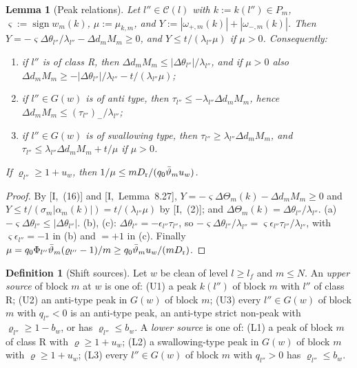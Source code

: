 \documentclass[10pt]{amsart}
\newtheorem{lemma}[theorem]{Lemma}
\theoremstyle{definition}
\newtheorem{definition}[theorem]{Definition}
\theoremstyle{remark}
\newcommand{\sgn}{\operatorname{sign}}
\begin{document}
\begin{lemma}[Peak relations]\label{lem:II-peakrel}
Let $l''\in\mathcal C(l)$ with $k:=k(l'')\in P_m$, $\varsigma:=\sgn w_m(k)$,
$\mu:=\mu_{k,m}$, and $Y:=|\omega_{+,m}(k)|+|\omega_{-,m}(k)|$.  Then
$Y=-\varsigma\Delta\theta_{l''}/\lambda_{l''}-\Delta d_mM_m\ge0$, and
$Y\le t/(\lambda_{l''}\mu)$ if $\mu>0$.  Consequently:
\begin{enumerate}
\item[(a)] if $l''$ is of class R, then $\Delta d_mM_m\le|\Delta\theta_{l''}|/
\lambda_{l''}$, and if $\mu>0$ also $\Delta d_mM_m\ge-|\Delta\theta_{l''}|/
\lambda_{l''}-t/(\lambda_{l''}\mu)$;
\item[(b)] if $l''\in G(w)$ is of anti type, then $\tau_{l''}\le
-\lambda_{l''}\Delta d_mM_m$, hence $\Delta d_mM_m\le(\tau_{l''})_-/
\lambda_{l''}$;
\item[(c)] if $l''\in G(w)$ is of swallowing type, then $\tau_{l''}\ge
\lambda_{l''}\Delta d_mM_m$, and $\tau_{l''}\le\lambda_{l''}\Delta d_mM_m+t/\mu$
if $\mu>0$.
\end{enumerate}
If $\varrho_{l''}\ge1+u_w$, then $1/\mu\le mD_{\rm r}/(q_0\bar\vartheta_mu_w)$.
\end{lemma}

\begin{proof}
By [I,~(16)] and [I,~Lemma~8.27], $Y=-\varsigma\Delta\Theta_m(k)-\Delta d_m
M_m\ge0$ and $Y\le t/(\sigma_m|\alpha_m(k)|)=t/(\lambda_{l''}\mu)$ by
[I,~(2)]; and $\Delta\Theta_m(k)=\Delta\theta_{l''}/\lambda_{l''}$.  (a)
$-\varsigma\Delta\theta_{l''}\le|\Delta\theta_{l''}|$.  (b), (c):
$\Delta\theta_{l''}=-\epsilon_{l''}\tau_{l''}$, so $-\varsigma\Delta
\theta_{l''}/\lambda_{l''}=\varsigma\epsilon_{l''}\tau_{l''}/\lambda_{l''}$,
with $\varsigma\epsilon_{l''}=-1$ in (b) and $=+1$ in (c).  Finally
$\mu=q_0\Phi_{l''}\bar\vartheta_m(\varrho_{l''}-1)/m\ge q_0\bar\vartheta_mu_w/(mD_{\rm r})$.
\end{proof}

\begin{definition}[Shift sources]\label{def:II-sources}
Let $w$ be clean of level $l\ge l_f$ and $m\le N$.  An \emph{upper source}
of block $m$ at $w$ is one of: (U1) a peak $k(l'')$ of block $m$ with $l''$
of class R; (U2) an anti-type peak in $G(w)$ of block $m$; (U3) every
$l''\in G(w)$ of block $m$ with $q_{l''}<0$ is an anti-type peak, an
anti-type strict non-peak with $\varrho_{l''}\ge1-b_w$, or has
$\varrho_{l''}\le b_w$.  A \emph{lower source} is one of: (L1) a peak of block
$m$ of class R with $\varrho\ge1+u_w$; (L2) a swallowing-type peak in $G(w)$ of
block $m$ with $\varrho\ge1+u_w$; (L3) every $l''\in G(w)$ of block $m$ with
$q_{l''}>0$ has $\varrho_{l''}\le b_w$.
\end{definition}
\end{document}
